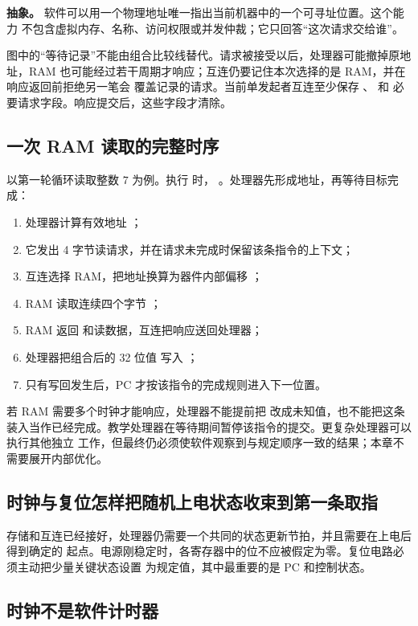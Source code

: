\textbf{抽象。} 软件可以用一个物理地址唯一指出当前机器中的一个可寻址位置。这个能力
不包含虚拟内存、名称、访问权限或并发仲裁；它只回答“这次请求交给谁”。

图中的“等待记录”不能由组合比较线替代。请求被接受以后，处理器可能撤掉原地址，RAM
也可能经过若干周期才响应；互连仍要记住本次选择的是 RAM，并在响应返回前拒绝另一笔会
覆盖记录的请求。当前单发起者互连至少保存 、 和
必要请求字段。响应提交后，这些字段才清除。

\subsection{一次 RAM 读取的完整时序}

以第一轮循环读取整数 \(7\) 为例。执行  时，
。处理器先形成地址，再等待目标完成：

\begin{enumerate}
\item 处理器计算有效地址 ；
\item 它发出 4 字节读请求，并在请求未完成时保留该条指令的上下文；
\item 互连选择 RAM，把地址换算为器件内部偏移 ；
\item RAM 读取连续四个字节 ；
\item RAM 返回  和读数据，互连把响应送回处理器；
\item 处理器把组合后的 32 位值  写入 ；
\item 只有写回发生后，PC 才按该指令的完成规则进入下一位置。
\end{enumerate}

若 RAM 需要多个时钟才能响应，处理器不能提前把  改成未知值，也不能把这条
装入当作已经完成。教学处理器在等待期间暂停该指令的提交。更复杂处理器可以执行其他独立
工作，但最终仍必须使软件观察到与规定顺序一致的结果；本章不需要展开内部优化。

\subsection{时钟与复位怎样把随机上电状态收束到第一条取指}

存储和互连已经接好，处理器仍需要一个共同的状态更新节拍，并且需要在上电后得到确定的
起点。电源刚稳定时，各寄存器中的位不应被假定为零。复位电路必须主动把少量关键状态设置
为规定值，其中最重要的是 PC 和控制状态。

\subsection{时钟不是软件计时器}

